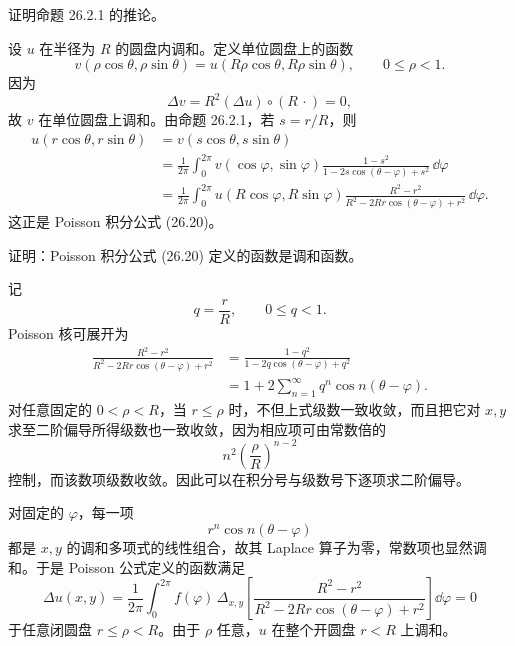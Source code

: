 \begin{xexercise}[5]
证明命题 26.2.1 的推论。
\end{xexercise}
\begin{xsolution}
设 $u$ 在半径为 $R$ 的圆盘内调和。定义单位圆盘上的函数
\[
  v(\rho\cos\theta,\rho\sin\theta)
  =u(R\rho\cos\theta,R\rho\sin\theta),
  \qquad 0\le\rho<1.
\]
因为
\[
  \Delta v=R^2(\Delta u)\circ(R\,\cdot)=0,
\]
故 $v$ 在单位圆盘上调和。由命题 26.2.1，若 $s=r/R$，则
\begin{align*}
  u(r\cos\theta,r\sin\theta)
  &=v(s\cos\theta,s\sin\theta)\\
  &=\frac{1}{2\pi}\int_0^{2\pi}
    v(\cos\varphi,\sin\varphi)
    \frac{1-s^2}{1-2s\cos(\theta-\varphi)+s^2}\,\dd\varphi\\
  &=\frac{1}{2\pi}\int_0^{2\pi}
    u(R\cos\varphi,R\sin\varphi)
    \frac{R^2-r^2}{R^2-2Rr\cos(\theta-\varphi)+r^2}\,\dd\varphi.
\end{align*}
这正是 Poisson 积分公式 (26.20)。
\end{xsolution}


\begin{xexercise}[6]
证明：Poisson 积分公式 (26.20) 定义的函数是调和函数。
\end{xexercise}
\begin{xsolution}
记
\[
  q=\frac{r}{R},\qquad 0\le q<1.
\]
Poisson 核可展开为
\begin{align*}
  \frac{R^2-r^2}{R^2-2Rr\cos(\theta-\varphi)+r^2}
  &=\frac{1-q^2}{1-2q\cos(\theta-\varphi)+q^2}\\
  &=1+2\sum_{n=1}^\infty q^n\cos n(\theta-\varphi).
\end{align*}
对任意固定的 $0<\rho<R$，当 $r\le\rho$ 时，不但上式级数一致收敛，而且把它对 $x,y$ 求至二阶偏导所得级数也一致收敛，因为相应项可由常数倍的
\[
  n^2\left(\frac{\rho}{R}\right)^{n-2}
\]
控制，而该数项级数收敛。因此可以在积分号与级数号下逐项求二阶偏导。

对固定的 $\varphi$，每一项
\[
  r^n\cos n(\theta-\varphi)
\]
都是 $x,y$ 的调和多项式的线性组合，故其 Laplace 算子为零，常数项也显然调和。于是 Poisson 公式定义的函数满足
\[
  \Delta u(x,y)
  =\frac{1}{2\pi}\int_0^{2\pi}
  f(\varphi)\,\Delta_{x,y}
  \left[
  \frac{R^2-r^2}{R^2-2Rr\cos(\theta-\varphi)+r^2}
  \right]\dd\varphi=0
\]
于任意闭圆盘 $r\le\rho<R$。由于 $\rho$ 任意，$u$ 在整个开圆盘 $r<R$ 上调和。
\end{xsolution}


